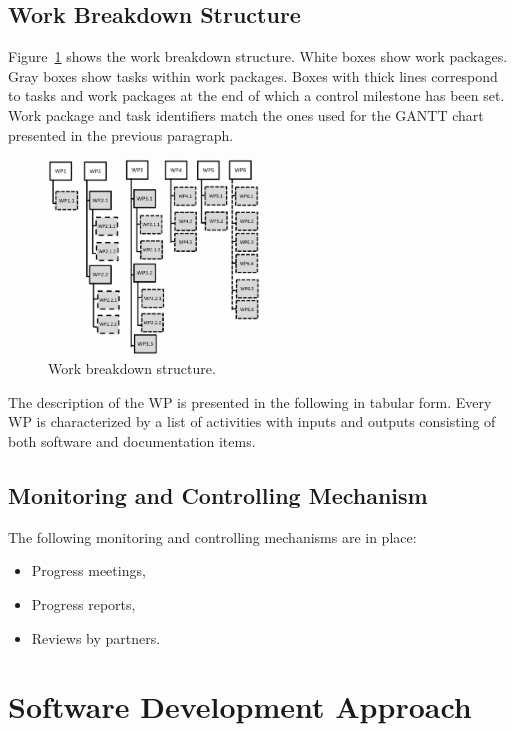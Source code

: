 \subsection{Work Breakdown Structure}

Figure~\ref{fig:work_breakdown} shows the work breakdown structure. White boxes show work packages. Gray boxes show tasks within work packages. Boxes with thick lines correspond to tasks and work packages at the end of which a control milestone has been set. Work package and task identifiers match the ones used for the GANTT chart presented in the previous paragraph.

\begin{figure}[H]
\caption{Work breakdown structure.}
\label{fig:work_breakdown}
\centering
\includegraphics[width=0.5\textwidth]{images/work_breakdown}
\end{figure}

The description of the WP is presented in the following in tabular form.
Every WP is characterized by a list of activities with inputs and outputs consisting of both software and documentation items.



\subsection{Monitoring and Controlling Mechanism}

The following monitoring and controlling mechanisms are in place:
\begin{itemize}
  \item Progress meetings,
  \item Progress reports,
  \item Reviews by partners.
\end{itemize}

\section{Software Development Approach}

